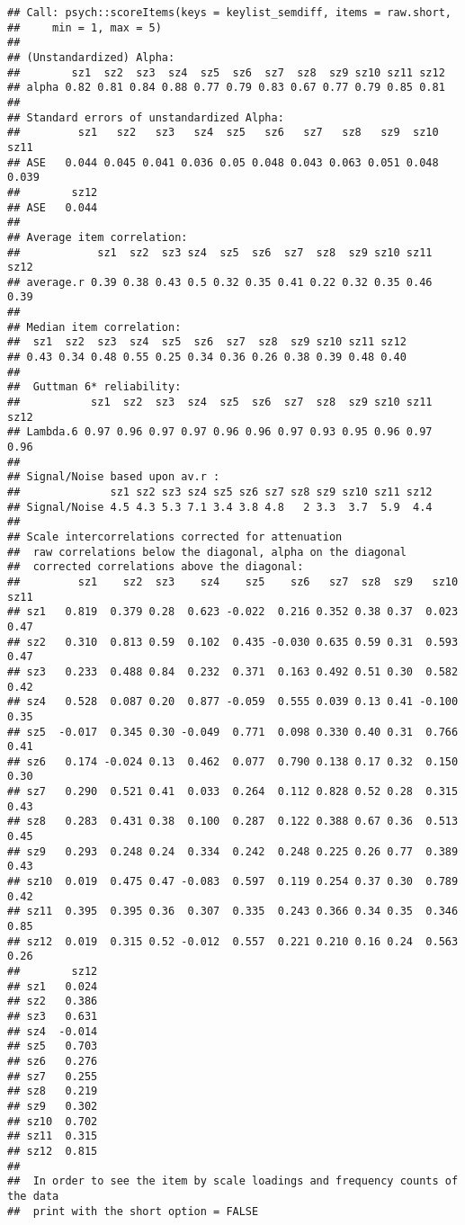 \documentclass[]{article}
\begin{document}
\begin{verbatim}
## Call: psych::scoreItems(keys = keylist_semdiff, items = raw.short, 
##     min = 1, max = 5)
## 
## (Unstandardized) Alpha:
##        sz1  sz2  sz3  sz4  sz5  sz6  sz7  sz8  sz9 sz10 sz11 sz12
## alpha 0.82 0.81 0.84 0.88 0.77 0.79 0.83 0.67 0.77 0.79 0.85 0.81
## 
## Standard errors of unstandardized Alpha:
##         sz1   sz2   sz3   sz4  sz5   sz6   sz7   sz8   sz9  sz10  sz11
## ASE   0.044 0.045 0.041 0.036 0.05 0.048 0.043 0.063 0.051 0.048 0.039
##        sz12
## ASE   0.044
## 
## Average item correlation:
##            sz1  sz2  sz3 sz4  sz5  sz6  sz7  sz8  sz9 sz10 sz11 sz12
## average.r 0.39 0.38 0.43 0.5 0.32 0.35 0.41 0.22 0.32 0.35 0.46 0.39
## 
## Median item correlation:
##  sz1  sz2  sz3  sz4  sz5  sz6  sz7  sz8  sz9 sz10 sz11 sz12 
## 0.43 0.34 0.48 0.55 0.25 0.34 0.36 0.26 0.38 0.39 0.48 0.40 
## 
##  Guttman 6* reliability: 
##           sz1  sz2  sz3  sz4  sz5  sz6  sz7  sz8  sz9 sz10 sz11 sz12
## Lambda.6 0.97 0.96 0.97 0.97 0.96 0.96 0.97 0.93 0.95 0.96 0.97 0.96
## 
## Signal/Noise based upon av.r : 
##              sz1 sz2 sz3 sz4 sz5 sz6 sz7 sz8 sz9 sz10 sz11 sz12
## Signal/Noise 4.5 4.3 5.3 7.1 3.4 3.8 4.8   2 3.3  3.7  5.9  4.4
## 
## Scale intercorrelations corrected for attenuation 
##  raw correlations below the diagonal, alpha on the diagonal 
##  corrected correlations above the diagonal:
##         sz1    sz2  sz3    sz4    sz5    sz6   sz7  sz8  sz9   sz10 sz11
## sz1   0.819  0.379 0.28  0.623 -0.022  0.216 0.352 0.38 0.37  0.023 0.47
## sz2   0.310  0.813 0.59  0.102  0.435 -0.030 0.635 0.59 0.31  0.593 0.47
## sz3   0.233  0.488 0.84  0.232  0.371  0.163 0.492 0.51 0.30  0.582 0.42
## sz4   0.528  0.087 0.20  0.877 -0.059  0.555 0.039 0.13 0.41 -0.100 0.35
## sz5  -0.017  0.345 0.30 -0.049  0.771  0.098 0.330 0.40 0.31  0.766 0.41
## sz6   0.174 -0.024 0.13  0.462  0.077  0.790 0.138 0.17 0.32  0.150 0.30
## sz7   0.290  0.521 0.41  0.033  0.264  0.112 0.828 0.52 0.28  0.315 0.43
## sz8   0.283  0.431 0.38  0.100  0.287  0.122 0.388 0.67 0.36  0.513 0.45
## sz9   0.293  0.248 0.24  0.334  0.242  0.248 0.225 0.26 0.77  0.389 0.43
## sz10  0.019  0.475 0.47 -0.083  0.597  0.119 0.254 0.37 0.30  0.789 0.42
## sz11  0.395  0.395 0.36  0.307  0.335  0.243 0.366 0.34 0.35  0.346 0.85
## sz12  0.019  0.315 0.52 -0.012  0.557  0.221 0.210 0.16 0.24  0.563 0.26
##        sz12
## sz1   0.024
## sz2   0.386
## sz3   0.631
## sz4  -0.014
## sz5   0.703
## sz6   0.276
## sz7   0.255
## sz8   0.219
## sz9   0.302
## sz10  0.702
## sz11  0.315
## sz12  0.815
## 
##  In order to see the item by scale loadings and frequency counts of the data
##  print with the short option = FALSE
\end{verbatim}
\end{document}
